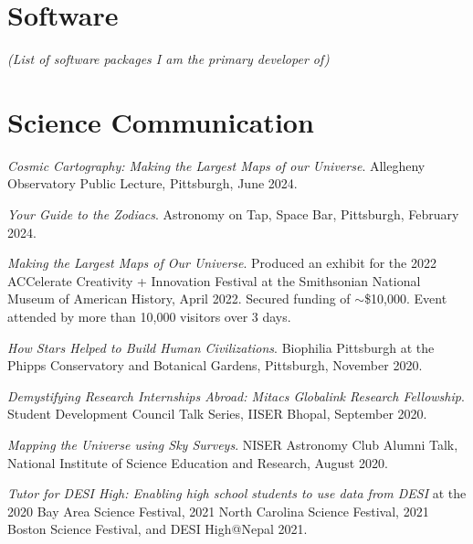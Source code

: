 \documentclass[10pt,a4paper,roman,]{moderncv} %
\begin{document}
\section{Software}
\begin{center}
    \textit{\small(List of software packages I am the primary developer of)\\}
\end{center}


\section{Science Communication}

 \begin{etaremune}[leftmargin=40pt,labelsep=10pt]
 \item \textit{Cosmic Cartography: Making the Largest Maps of our Universe}. Allegheny Observatory Public Lecture, Pittsburgh, June 2024.
 \item \textit{Your Guide to the Zodiacs}. Astronomy on Tap, Space Bar, Pittsburgh, February 2024.
 \item \textit{Making the Largest Maps of Our Universe}. Produced an exhibit for the 2022 ACCelerate Creativity + Innovation Festival at the Smithsonian National Museum of American History, April 2022. Secured funding of $\sim$\$10,000. Event attended by more than 10,000 visitors over 3 days. 
 \item \textit{How Stars Helped to Build Human Civilizations}. Biophilia Pittsburgh at the Phipps Conservatory and Botanical Gardens, Pittsburgh, November 2020.
\item \textit{Demystifying Research Internships Abroad: Mitacs Globalink Research Fellowship}. Student Development
Council Talk Series, IISER Bhopal, September 2020.
\item \textit{Mapping the Universe using Sky Surveys}. NISER Astronomy Club Alumni Talk, National Institute of Science Education and Research, August 2020.
\item \textit{Tutor for DESI High: Enabling high school students to use data from DESI} at the 2020 Bay Area Science Festival, 2021 North Carolina Science Festival, 2021 Boston Science Festival, and DESI High@Nepal 2021.
\end{etaremune}
\end{document}
